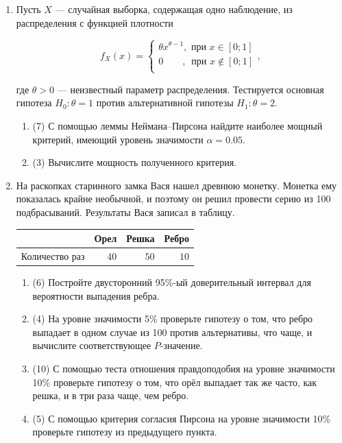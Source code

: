 \begin{enumerate}


\item Пусть $X$ — случайная выборка, содержащая одно наблюдение, из распределения с функцией плотности

\[
f_X(x) =
	\begin{cases}
	\theta x^{\theta-1},\text{ при }  x \in [0; 1] \\
	0\quad \quad \text{, }\text{ при } x \notin  [0; 1] \\
	\end{cases},
\]

где $\theta>0$ — неизвестный параметр распределения. Тестируется основная гипотеза $H_{0}:\theta=1$ против альтернативной гипотезы $H_{1}:\theta=2$.

\begin{enumerate}
    \item (7) С помощью леммы Неймана–Пирсона найдите наиболее мощный критерий, имеющий уровень значимости $\alpha=0.05$.
    \item (3) Вычислите мощность полученного критерия.
\end{enumerate}


\item На раскопках старинного замка Вася нашел древнюю монетку. Монетка ему показалась крайне необычной, и поэтому он решил провести серию из 100 подбрасываний. Результаты Вася записал в таблицу.

\begin{center}\begin{tabular}{rrrr}
\toprule
   & Орел   & Решка & Ребро  \\ \midrule
Количество раз &   $40$ & $50$ & $10$ \\ \bottomrule
\end{tabular}\end{center}
\begin{enumerate}
    \item (6) Постройте двусторонний 95\%-ый доверительный интервал для вероятности выпадения ребра.
    \item (4) На уровне значимости 5\% проверьте гипотезу о том, что ребро выпадает в одном случае из 100 против альтернативы, что чаще, и вычислите соответствующее $P$-значение.
    \item (10) С помощью теста отношения правдоподобия на уровне значимости 10\% проверьте гипотезу о том, что орёл выпадает так же часто, как решка, и в три раза чаще, чем ребро.
    \item (5) С помощью критерия согласия Пирсона на уровне значимости 10\% проверьте гипотезу из предыдущего пункта.
\end{enumerate}


\end{enumerate}
